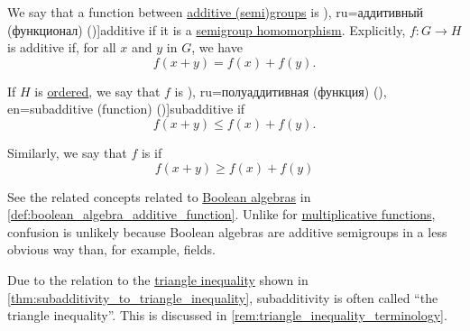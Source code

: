 \begin{definition}\label{def:additive_function}\mimprovised
  We say that a function between \hyperref[con:additive_semigroup]{additive (semi)groups} is \term[en=additive (function) (\cite[\S 8.17]{Schechter1997AnalysisHandbook}), ru=аддитивный (функционал) (\cite[80]{Вулих1973ВещественныйАнализ})]{additive} if it is a \hyperref[def:semigroup/homomorphism]{semigroup homomorphism}. Explicitly, \( f: G \to H \) is additive if, for all \( x \) and \( y \) in \( G \), we have
  \begin{equation}\label{eq:def:additive_function}
    f(x + y) = f(x) + f(y).
  \end{equation}

  \begin{thmenum}
     If \( H \) is \hyperref[def:ordered_semigroup]{ordered}, we say that \( f \) is \term[bg=полуадитивна (функция) (\cite[162]{Тагамлицки1978ИнтегралноСмятане}), ru=полуаддитивная (функция) (\cite[80]{КанторовичАкилов1984ФункциональныйАнализ}), en=subadditive (function) (\cite[\S 8.17]{Schechter1997AnalysisHandbook})]{subadditive} if
    \begin{equation}\label{eq:def:additive_function/sub}
      f(x + y) \leq f(x) + f(y).
    \end{equation}

     Similarly, we say that \( f \) is  if
    \begin{equation}\label{eq:def:additive_function/super}
      f(x + y) \geq f(x) + f(y)
    \end{equation}
  \end{thmenum}
\end{definition}
\begin{comments}
  \item See the related concepts related to \hyperref[def:boolean_algebra]{Boolean algebras} in \cref{def:boolean_algebra_additive_function}. Unlike for \hyperref[def:multiplicative_function]{multiplicative functions}, confusion is unlikely because Boolean algebras are additive semigroups in a less obvious way than, for example, fields.

  \item Due to the relation to the \hyperref[def:triangle_inequality]{triangle inequality} shown in \cref{thm:subadditivity_to_triangle_inequality}, subadditivity is often called \enquote{the triangle inequality}. This is discussed in \cref{rem:triangle_inequality_terminology}.
\end{comments}

